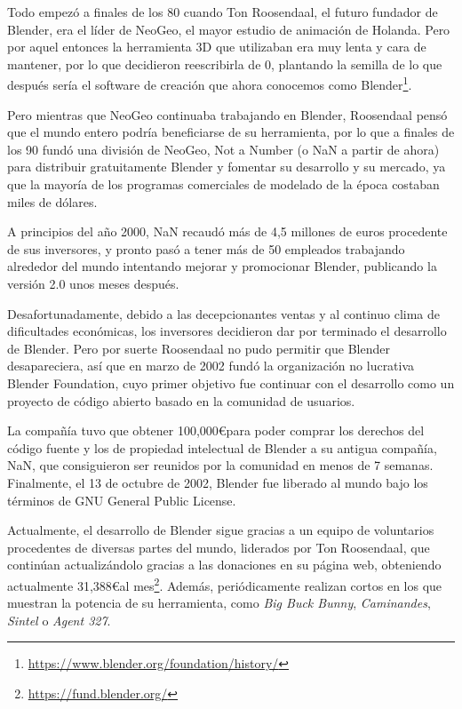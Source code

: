 Todo empezó a finales de los 80 cuando Ton Roosendaal, el futuro fundador de Blender, era el líder de NeoGeo, el mayor estudio de animación de Holanda. Pero por aquel entonces la herramienta 3D que utilizaban era muy lenta y cara de mantener, por lo que decidieron reescribirla de 0, plantando la semilla de lo que después sería el software de creación que ahora conocemos como Blender\footnote{\url{https://www.blender.org/foundation/history/}}. 

Pero mientras que NeoGeo continuaba trabajando en Blender, Roosendaal pensó que el mundo entero podría beneficiarse de su herramienta, por lo que a finales de los 90 fundó una división de NeoGeo, Not a Number (o NaN a partir de ahora) para distribuir gratuitamente Blender y fomentar su desarrollo y su mercado, ya que la mayoría de los programas comerciales de modelado de la época costaban miles de dólares.

A principios del año 2000, NaN recaudó más de 4,5 millones de euros procedente de sus inversores, y pronto pasó a tener más de 50 empleados trabajando alrededor del mundo intentando mejorar y promocionar Blender, publicando la versión 2.0 unos meses después.

Desafortunadamente, debido a las decepcionantes ventas y al continuo clima de dificultades económicas, los inversores decidieron dar por terminado el desarrollo de Blender. Pero por suerte Roosendaal no pudo permitir que Blender desapareciera, así que en marzo de 2002 fundó la organización no lucrativa Blender Foundation, cuyo primer objetivo fue continuar con el desarrollo como un proyecto de código abierto basado en la comunidad de usuarios.

La compañía tuvo que obtener 100,000\euro para poder comprar los derechos del código fuente y los de propiedad intelectual de Blender a su antigua compañía, NaN, que consiguieron ser reunidos por la comunidad en menos de 7 semanas. Finalmente, el 13 de octubre de 2002, Blender fue liberado al mundo bajo los términos de GNU General Public License. 

Actualmente, el desarrollo de Blender sigue gracias a un equipo de voluntarios procedentes de diversas partes del mundo, liderados por Ton Roosendaal, que continúan actualizándolo gracias a las donaciones en su página web, obteniendo actualmente 31,388\euro al mes\footnote{\url{https://fund.blender.org/}}. Además, periódicamente realizan cortos en los que muestran la potencia de su herramienta, como \textit{Big Buck Bunny}, \textit{Caminandes}, \textit{Sintel} o \textit{Agent 327}.

